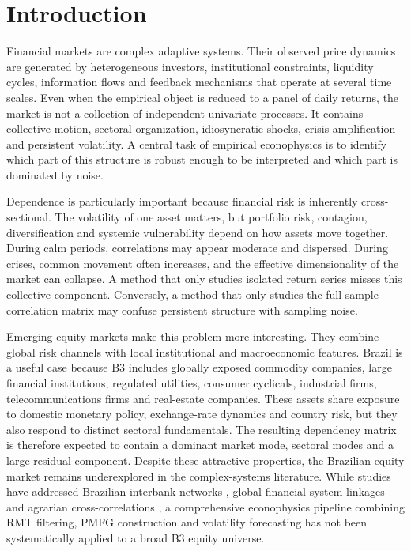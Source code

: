 \section{Introduction}
\label{sec:introduction}

Financial markets are complex adaptive systems. Their observed price dynamics are generated by heterogeneous investors, institutional constraints, liquidity cycles, information flows and feedback mechanisms that operate at several time scales. Even when the empirical object is reduced to a panel of daily returns, the market is not a collection of independent univariate processes. It contains collective motion, sectoral organization, idiosyncratic shocks, crisis amplification and persistent volatility. A central task of empirical econophysics is to identify which part of this structure is robust enough to be interpreted and which part is dominated by noise.

Dependence is particularly important because financial risk is inherently cross-sectional. The volatility of one asset matters, but portfolio risk, contagion, diversification and systemic vulnerability depend on how assets move together. During calm periods, correlations may appear moderate and dispersed. During crises, common movement often increases, and the effective dimensionality of the market can collapse. A method that only studies isolated return series misses this collective component. Conversely, a method that only studies the full sample correlation matrix may confuse persistent structure with sampling noise.

Emerging equity markets make this problem more interesting. They combine global risk channels with local institutional and macroeconomic features. Brazil is a useful case because B3 includes globally exposed commodity companies, large financial institutions, regulated utilities, consumer cyclicals, industrial firms, telecommunications firms and real-estate companies. These assets share exposure to domestic monetary policy, exchange-rate dynamics and country risk, but they also respond to distinct sectoral fundamentals. The resulting dependency matrix is therefore expected to contain a dominant market mode, sectoral modes and a large residual component. Despite these attractive properties, the Brazilian equity market remains underexplored in the complex-systems literature. While studies have addressed Brazilian interbank networks \cite{tabak_2010_topology}, global financial system linkages \cite{silva_2016_structure} and agrarian cross-correlations \cite{stosic_2015_correlations}, a comprehensive econophysics pipeline combining RMT filtering, PMFG construction and volatility forecasting has not been systematically applied to a broad B3 equity universe.

